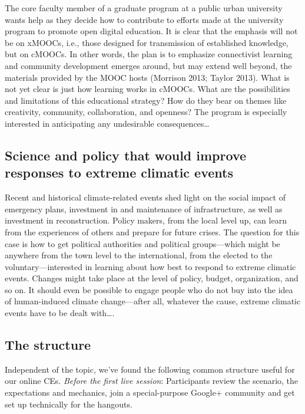 The core faculty member of a graduate program at a public urban
university wants help as they decide how to contribute to efforts made
at the university program to promote open digital education. It is clear
that the emphasis will not be on xMOOCs, i.e., those designed for
transmission of established knowledge, but on cMOOCs. In other words,
the plan is to emphasize connectivist learning and community development
emerges around, but may extend well beyond, the materials provided by
the MOOC hosts (Morrison 2013; Taylor 2013). What is not yet clear is
just how learning works in cMOOCs. What are the possibilities and
limitations of this educational strategy? How do they bear on themes
like creativity, community, collaboration, and openness? The program is
especially interested in anticipating any undesirable
consequences\ldots{}

\hypertarget{science-and-policy-that-would-improve-responses-to-extreme-climatic-events}{%
\subsection{Science and policy that would improve responses to
extreme climatic
events}\label{science-and-policy-that-would-improve-responses-to-extreme-climatic-events}}

Recent and historical climate-related events shed light on the social
impact of emergency plans, investment in and maintenance of
infrastructure, as well as investment in reconstruction. Policy makers,
from the local level up, can learn from the experiences of others and
prepare for future crises. The question for this case is how to get
political authorities and political groups---which might be anywhere
from the town level to the international, from the elected to the
voluntary---interested in learning about how best to respond to extreme
climatic events. Changes might take place at the level of policy,
budget, organization, and so on. It should even be possible to engage
people who do not buy into the idea of human-induced climate
change---after all, whatever the cause, extreme climatic events have to
be dealt with\ldots.

\hypertarget{the-structure}{%
\subsection{The structure}\label{the-structure}}

Independent of the topic, we've found the following common structure
useful for our online CEs. \emph{Before the first live session}:
Participants review the scenario, the expectations and mechanics, join a
special-purpose Google+ community and get set up technically for the
hangouts.

